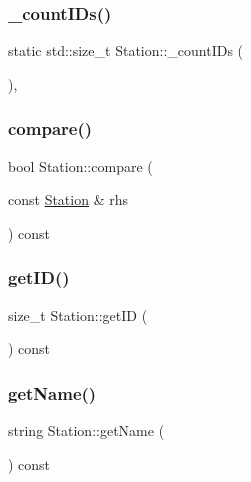 \subsubsection{\texorpdfstring{\+\_\+count\+I\+Ds()}{\_countIDs()}}
{\footnotesize\ttfamily static std\+::size\+\_\+t Station\+::\+\_\+count\+I\+Ds (\begin{DoxyParamCaption}{ }\end{DoxyParamCaption})\hspace{0.3cm}{\ttfamily [inline]}, {\ttfamily [static]}}

\mbox{\label{class_station_a92f492a4766127e6ffbe993f0873708c}} 
\subsubsection{\texorpdfstring{compare()}{compare()}}
{\footnotesize\ttfamily bool Station\+::compare (\begin{DoxyParamCaption}\item[{const \mbox{\hyperlink{class_station}{Station}} \&}]{rhs }\end{DoxyParamCaption}) const}

\mbox{\label{class_station_a69be6c90e4613e4166651ff6e67cfba2}} 
\subsubsection{\texorpdfstring{get\+I\+D()}{getID()}}
{\footnotesize\ttfamily size\+\_\+t Station\+::get\+ID (\begin{DoxyParamCaption}{ }\end{DoxyParamCaption}) const}

\mbox{\label{class_station_ac823ae175ec0e2baff462ed9612c7bae}} 
\subsubsection{\texorpdfstring{get\+Name()}{getName()}}
{\footnotesize\ttfamily string Station\+::get\+Name (\begin{DoxyParamCaption}{ }\end{DoxyParamCaption}) const}

